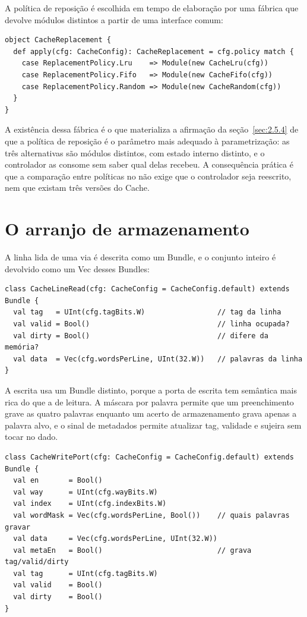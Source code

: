 A política de reposição é escolhida em tempo de elaboração por uma fábrica que devolve módulos distintos a partir de uma interface comum:


{\footnotesize
\begin{verbatim}
object CacheReplacement {
  def apply(cfg: CacheConfig): CacheReplacement = cfg.policy match {
    case ReplacementPolicy.Lru    => Module(new CacheLru(cfg))
    case ReplacementPolicy.Fifo   => Module(new CacheFifo(cfg))
    case ReplacementPolicy.Random => Module(new CacheRandom(cfg))
  }
}
\end{verbatim}
}


A existência dessa fábrica é o que materializa a afirmação da seção~\ref{sec:2.5.4} de que a política de reposição é o parâmetro mais adequado à parametrização: as três alternativas são módulos distintos, com estado interno distinto, e o controlador as consome sem saber qual delas recebeu. A consequência prática é que a comparação entre políticas no  não exige que o controlador seja reescrito, nem que existam três versões do Cache.

\section{O arranjo de armazenamento}\label{sec:5.3}

A linha lida de uma via é descrita como um Bundle, e o conjunto inteiro é devolvido como um Vec desses Bundles:


{\footnotesize
\begin{verbatim}
class CacheLineRead(cfg: CacheConfig = CacheConfig.default) extends Bundle {
  val tag   = UInt(cfg.tagBits.W)                 // tag da linha
  val valid = Bool()                              // linha ocupada?
  val dirty = Bool()                              // difere da memória?
  val data  = Vec(cfg.wordsPerLine, UInt(32.W))   // palavras da linha
}
\end{verbatim}
}


A escrita usa um Bundle distinto, porque a porta de escrita tem semântica mais rica do que a de leitura. A máscara por palavra permite que um preenchimento grave as quatro palavras enquanto um acerto de armazenamento grava apenas a palavra alvo, e o sinal de metadados permite atualizar tag, validade e sujeira sem tocar no dado.


{\footnotesize
\begin{verbatim}
class CacheWritePort(cfg: CacheConfig = CacheConfig.default) extends Bundle {
  val en       = Bool()
  val way      = UInt(cfg.wayBits.W)
  val index    = UInt(cfg.indexBits.W)
  val wordMask = Vec(cfg.wordsPerLine, Bool())    // quais palavras gravar
  val data     = Vec(cfg.wordsPerLine, UInt(32.W))
  val metaEn   = Bool()                           // grava tag/valid/dirty
  val tag      = UInt(cfg.tagBits.W)
  val valid    = Bool()
  val dirty    = Bool()
}
\end{verbatim}
}


